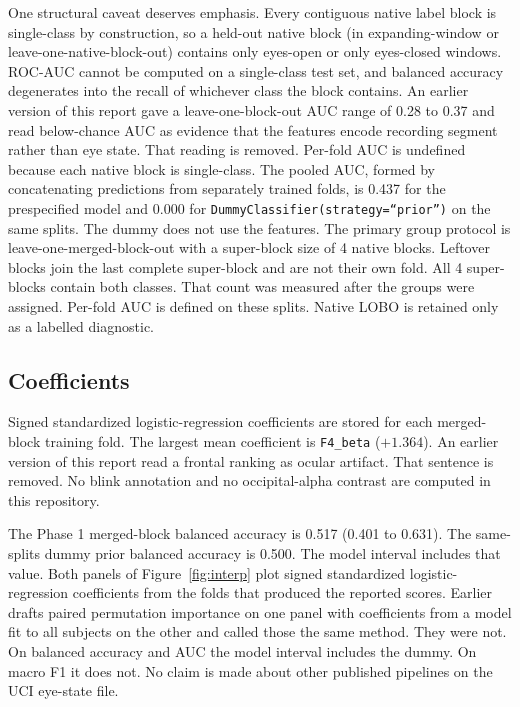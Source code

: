 \documentclass[11pt]{article}
\begin{document}
One structural caveat deserves emphasis. Every contiguous native label block is single-class by construction, so a held-out native block (in expanding-window or leave-one-native-block-out) contains only eyes-open or only eyes-closed windows. ROC-AUC cannot be computed on a single-class test set, and balanced accuracy degenerates into the recall of whichever class the block contains. An earlier version of this report gave a leave-one-block-out AUC range of 0.28 to 0.37 and read below-chance AUC as evidence that the features encode recording segment rather than eye state. That reading is removed. Per-fold AUC is undefined because each native block is single-class. The pooled AUC, formed by concatenating predictions from separately trained folds, is 0.437 for the prespecified model and 0.000 for \texttt{DummyClassifier(strategy=``prior'')} on the same splits. The dummy does not use the features. The primary group protocol is leave-one-merged-block-out with a super-block size of 4 native blocks. Leftover blocks join the last complete super-block and are not their own fold. All 4 super-blocks contain both classes. That count was measured after the groups were assigned. Per-fold AUC is defined on these splits. Native LOBO is retained only as a labelled diagnostic.

\subsection{Coefficients}
Signed standardized logistic-regression coefficients are stored for each merged-block training fold. The largest mean coefficient is \texttt{F4\_beta} ($+1.364$). An earlier version of this report read a frontal ranking as ocular artifact. That sentence is removed. No blink annotation and no occipital-alpha contrast are computed in this repository.

The Phase 1 merged-block balanced accuracy is 0.517 (0.401 to 0.631). The same-splits dummy prior balanced accuracy is 0.500. The model interval includes that value. Both panels of Figure~\ref{fig:interp} plot signed standardized logistic-regression coefficients from the folds that produced the reported scores. Earlier drafts paired permutation importance on one panel with coefficients from a model fit to all subjects on the other and called those the same method. They were not. On balanced accuracy and AUC the model interval includes the dummy. On macro F1 it does not. No claim is made about other published pipelines on the UCI eye-state file.
\end{document}
